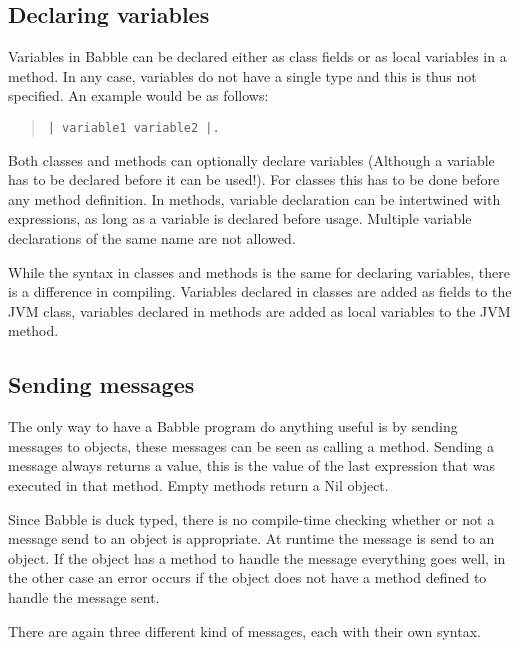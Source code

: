\documentclass[a4paper]{article}
\begin{document}
\subsection{Declaring variables}
Variables in Babble can be declared either as class fields or as local variables in a method. In any case, variables do not have a single type and this is thus not specified. An example would be as follows:
\begin{quote}
\begin{lstlisting}
| variable1 variable2 |.
\end{lstlisting}
\end{quote}

Both classes and methods can optionally declare variables (Although a variable has to be declared before it can be used!). For classes this has to be done before any method definition. In methods, variable declaration can be intertwined with expressions, as long as a variable is declared before usage. Multiple variable declarations of the same name are not allowed.

While the syntax in classes and methods is the same for declaring variables, there is a difference in compiling. Variables declared in classes are added as fields to the JVM class, variables declared in methods are added as local variables to the JVM method.



\subsection{Sending messages}

The only way to have a Babble program do anything useful is by sending messages to objects, these messages can be seen as calling a method. Sending a message always returns a value, this is the value of the last expression that was executed in that method. Empty methods return a Nil object.

Since Babble is duck typed, there is no compile-time checking whether or not a message send to an object is appropriate. At runtime the message is send to an object. If the object has a method to handle the message everything goes well, in the other case an error occurs if the object does not have a method defined to handle the message sent.

There are again three different kind of messages, each with their own syntax.
\end{document}
